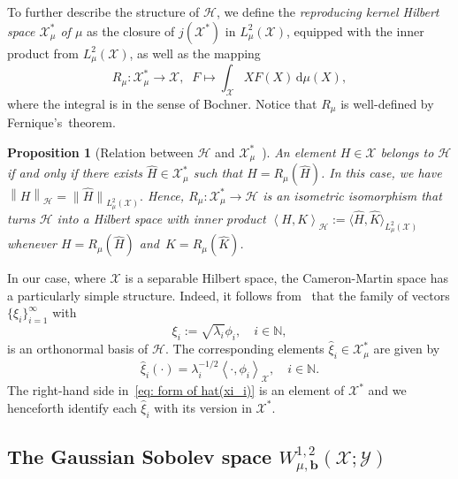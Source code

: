 \documentclass[namedate,webpdf]{ima-authoring-template-blank}
\def\D{\,\mathrm{d}}
\newcommand*{\nm}[1]{{\left\|#1\right \|}}
\newcommand*{\nmd}[1]{{\|#1\|}}    %
\newcommand*{\ip}[2]{\left\langle #1, #2 \right\rangle}
\newcommand*{\ipd}[2]{\langle #1, #2 \rangle}    %
\newcounter{counter}
\numberwithin{counter}{section}
\numberwithin{equation}{section}
\theoremstyle{plain}
\newtheorem{proposition}[counter]{Proposition}
\theoremstyle{definition}
\newcommand*{\cH}{\mathcal{H}}
\newcommand*{\cX}{\mathcal{X}}
\newcommand*{\cY}{\mathcal{Y}}
\newcommand*{\bbN}{\mathbb{N}}
\theoremstyle{thmstyletwo}
\begin{document}
To further describe the structure of \(\cH\), we define the \emph{reproducing kernel Hilbert space \(\cX_{\mu}^*\) of \(\mu\)} as the closure of \(j(\cX^*)\) in \(L_{\mu}^2(\cX)\), equipped with the inner product from \( L^2_{\mu}(\cX) \),
as well as the mapping
\[
R_{\mu}: \cX_{\mu}^* \to \cX, \;\; F \mapsto \int_\cX X F(X) \D \mu(X),
\]
where the integral is in the sense of Bochner. Notice that \(R_{\mu}\) is well-defined by Fernique's~theorem.

\begin{proposition}[{Relation between \(\cH\) and \(\cX_{\mu}^*\)~\citep[Prop. 3.1.2]{lunardi_InfiniteDimensionalAnalysis_2015}}]
    An element \(H \in \cX\) belongs to \(\cH\) if and only if there exists \(\hat{H} \in \cX_{\mu}^*\) such that \(H = R_{\mu}(\hat{H})\). In this case, we have
    \(
    \nm{H}_{\cH} = \nmd{\hat{H}}_{L_{\mu}^2(\cX)}.
    \)
    Hence, \(R_{\mu}: \cX_{\mu}^* \to \cH\) is an isometric isomorphism that turns \(\cH\) into a Hilbert space with inner product 
    \(
    \ip{H}{K}_{\cH} := \ipd{\hat{H}}{\hat{K}}_{L_{\mu}^2(\cX)}
    \)
    whenever \(H = R_{\mu}(\hat{H})\) and~\(K = R_{\mu}(\hat{K})\).
\end{proposition}

In our case, where \(\cX\) is a separable Hilbert space, the Cameron-Martin space has a particularly simple structure. Indeed, it follows from~\citet[Thm. 4.2.7]{lunardi_InfiniteDimensionalAnalysis_2015} that the family of vectors \(\{\xi_i\}_{i=1}^{\infty}\) with 
\begin{equation}\label{eq: orthonormal basis of cH}
    \xi_i := \sqrt{\lambda_i} \phi_i, \quad i \in \bbN,
\end{equation}
is an orthonormal basis of \(\cH\). The corresponding elements \(\hat{\xi}_i \in \cX_{\mu}^*\) are given by
\begin{equation}
\label{eq: form of hat(xi_i)}
    \hat{\xi}_i(\cdot) = \lambda_i^{-1/2} \ip{\cdot}{\phi_i}_{\cX}, \quad i \in \bbN.
\end{equation}
The right-hand side in~\eqref{eq: form of hat(xi_i)} is an element of \(\cX^*\) and we henceforth identify each \(\hat{\xi}_i\) with its version in \(\cX^*\).


\subsection[The Gaussian Sobolev space]{The Gaussian Sobolev space \(W_{\mu, \bm{b}}^{1,2}(\cX; \cY)\)}
\label{subsec: app: the Gaussian Sobolev space}
\end{document}
